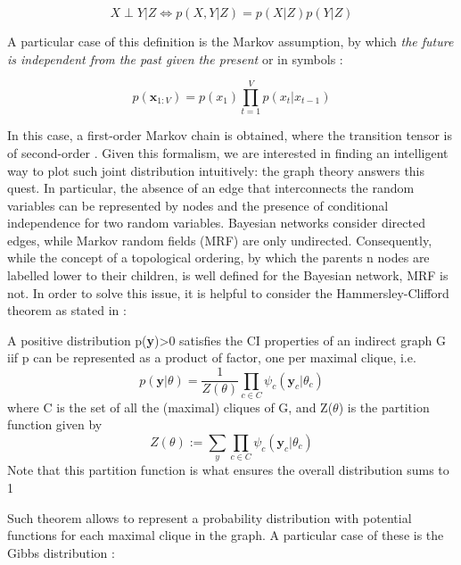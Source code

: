 \documentclass[12pt,%
               a4paper,%
               oneside,openany,%
               titlepage,%
               headinclude,footinclude,%
               BCOR5mm,%
               cleardoublepage=empty,%
               tablecaptionabove,%
               floatperchapter,
               ]{scrreprt}                 %
\begin{document}
\begin{equation}
X  \perp Y| Z \iff  p(X,Y|Z) = p(X|Z)p(Y|Z)
\end{equation}

A particular case of this definition is the Markov assumption,  by which \textit{the future is independent from the past given the present } or in symbols \cite{murphy2012machine}: 

\begin{equation}
p(\textbf{x}_{1:V})=p(x_{1})\prod^{V}_{t=1}p(x_{t}|x_{t-1})
\end{equation}

In this case, a first-order Markov chain is obtained,  where the transition tensor is of second-order \cite{wu2017markov}.  Given this formalism, we are interested in finding an intelligent way to plot such joint distribution intuitively: the graph theory answers this quest.  In particular, the absence of an edge that interconnects the random variables can be represented by nodes and the presence of conditional independence for two random variables.  Bayesian networks consider directed edges,  while Markov random fields (MRF) are only undirected.  Consequently,  while the concept of a topological ordering,  by which the parents n nodes are labelled lower to their children,  is well defined for the Bayesian network, MRF is not.  In order to solve this issue, it is helpful to consider the Hammersley-Clifford theorem as stated in \cite{murphy2012machine}:

\begin{theorem}
A positive distribution p(\textbf{y})>0 satisfies the CI properties of an indirect graph G iif p can be represented as a product of factor, one per maximal clique,  i.e.
\begin{equation}
p(\textbf{y}|\theta)= \dfrac{1}{Z(\theta)}\prod_{c \in C }\psi_{c}(\textbf{y}_{c}|\theta_{c})
\end{equation}
where C is the set of all the (maximal) cliques of G,  and Z($\theta$) is the partition function given by 
\begin{equation}
Z(\theta):= \sum_{y}\prod_{c\in C}\psi_{c}(\textbf{y}_{c}|\theta_{c})
\end{equation}
Note that this partition function is what ensures the overall distribution sums to 1
\end{theorem}

Such theorem allows to represent a probability distribution with potential functions for each maximal clique in the graph.  A particular case of these is the Gibbs distribution \cite{murphy2012machine}: 
\end{document}
